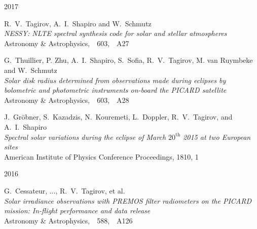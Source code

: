 

\begin{cventries}

  \cventry
    {}     %
    {}     %
    {}     %
    {2017} %
    {
      \begin{cvitems} %
        \item {R.~V.~Tagirov, A.~I.~Shapiro and W.~Schmutz\\
               \textit{NESSY: NLTE spectral synthesis code for solar and stellar atmospheres}\\
               Astronomy \& Astrophysics,\ \ 603,\ \ A27}\\
        \item {G.~Thuillier, P. Zhu, A.~I.~Shapiro, S.~Sofia, R.~V.~Tagirov, M. van Ruymbeke and W.~Schmutz\\
              \textit{Solar disk radius determined from observations made during eclipses by bolometric and photometric instruments on-board the PICARD satellite}\\
               Astronomy \& Astrophysics,\ \ 603,\ \ A28}\\
        \item {J.~Gr\"{o}bner, S.~Kazadzis, N.~Kouremeti, L.~Doppler, R.~V.~Tagirov, and A.~I.~Shapiro\\
              \textit{Spectral solar variations during the eclipse of March $20^\mathrm{th}$ 2015 at two European sites}\\
              American Institute of Physics Conference Proceedings, 1810, 1}
      \end{cvitems}
    }

  \cventry
    {}     %
    {}     %
    {}     %
    {2016} %
    {
      \begin{cvitems} %
        \item {G.~Cessateur, ..., R.~V.~Tagirov, et al.\\
               \textit{Solar irradiance observations with PREMOS filter radiometers on the PICARD mission: In-flight performance and data release}\\
               Astronomy \& Astrophysics,\ \ 588,\ \ A126}
      \end{cvitems}
    }


\end{cventries}
